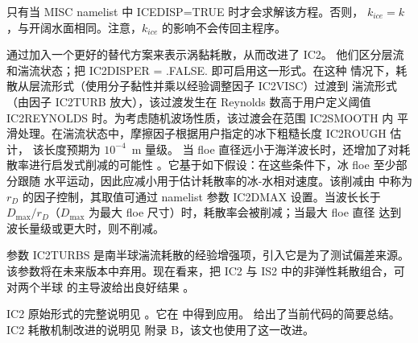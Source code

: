 只有当 {\F MISC} namelist 中 ICEDISP=TRUE 时才会求解该方程。否则，
$k_{ice}=k$，与开阔水面相同。注意，$k_{ice}$ 的影响不会传回主程序。

\cite{art:SAG16} 通过加入一个更好的替代方案来表示涡黏耗散，从而改进了 {\code IC2}。
他们区分层流和湍流状态；把 {\code IC2DISPER = .FALSE.} 即可启用这一形式。在这种
情况下，耗散从层流形式（使用分子黏性并乘以经验调整因子 {\code IC2VISC}）过渡到
湍流形式（由因子 {\code IC2TURB} 放大），该过渡发生在 Reynolds 数高于用户定义阈值
{\code IC2REYNOLDS} 时。为考虑随机波场性质，该过渡会在范围 {\code IC2SMOOTH} 内
平滑处理。在湍流状态中，摩擦因子根据用户指定的冰下粗糙长度 {\code IC2ROUGH} 估计，
该长度预期为 $10^{-4}$~m 量级。
当 floe 直径远小于海洋波长时，还增加了对耗散率进行启发式削减的可能性
\citep[细节见][]{Aea18}。它基于如下假设：在这些条件下，冰 floe 至少部分跟随
水平运动，因此应减小用于估计耗散率的冰-水相对速度。该削减由 \cite{Aea18} 中称为
$r_D$ 的因子控制，其取值可通过 namelist 参数 {\code IC2DMAX} 设置。当波长长于
$D_{\max}/r_D$（$D_{\max}$ 为最大 floe 尺寸）时，耗散率会被削减；当最大 floe 直径
达到波长量级或更大时，则不削减。

参数 {\code IC2TURBS} 是南半球湍流耗散的经验增强项，引入它是为了测试偏差来源。
该参数将在未来版本中弃用。现在看来，把 IC2 与 IS2 中的非弹性耗散组合，可对两个半球
的主导波给出良好结果 \citep{Aea18}。

{\code IC2} 原始形式的完整说明见 \cite{rep:RO13}。它在 \cite{art:LKS15} 中得到应用。
\cite{rep:RPLA18} 给出了当前代码的简要总结。{\code IC2} 耗散机制改进的说明见
\cite{art:SAG16} 附录 B，该文也使用了这一改进。
